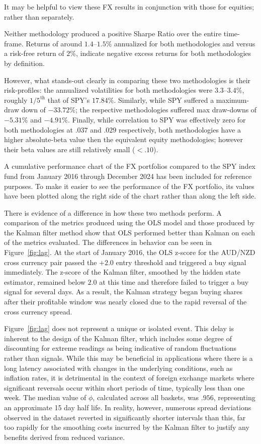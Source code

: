 \documentclass[12pt]{article}
\begin{document}
It may be helpful to view these FX results in conjunction with those for equities; rather than separately.

Neither methodology produced a positive Sharpe Ratio over the entire time-frame. Returns of around $1.4$--$1.5\%$ annualized for both methodologies and versus a risk-free return of $2\%$, indicate negative excess returns for both methodologies by definition.

However, what stands-out clearly in comparing these two methodologies is their risk-profiles: the annualized volatilities for both methodologies were $3.3$--$3.4\%$, roughly $1/5^{\text{th}}$ that of SPY's $17.84\%$. Similarly, while SPY suffered a maximum-draw down of $-33.72\%$; the respective methodologies suffered max draw-downs of $-5.31\%$ and $-4.91\%$. Finally, while correlation to SPY was effectively zero for both methodologies at $.037$ and $.029$ respectively, both methodologies have a higher absolute-beta value then the equivalent equity methodologies; however their beta values are still relatively small ($<.10$).

A cumulative performance chart of the FX portfolios compared to the SPY index fund from January 2016 through December 2024 has been included for reference purposes. To make it easier to see the performance of the FX portfolio, its values have been plotted along the right side of the chart rather than along the left side.

There is evidence of a difference in how these two methods perform. A comparison of the metrics produced using the OLS model and those produced by the Kalman filter method show that OLS performed better than Kalman on each of the metrics evaluated. The differences in behavior can be seen in Figure~\ref{fig:lag}. At the start of January 2016, the OLS z-score for the AUD/NZD cross currency pair passed the $+2.0$ entry threshold and triggered a buy signal immediately. The z-score of the Kalman filter, smoothed by the hidden state estimator, remained below $2.0$ at this time and therefore failed to trigger a buy signal for several days. As a result, the Kalman strategy began buying shares after their profitable window was nearly closed due to the rapid reversal of the cross currency spread.

Figure~\ref{fig:lag} does not represent a unique or isolated event. This delay is inherent to the design of the Kalman filter, which includes some degree of discounting for extreme readings as being indicative of random fluctuations rather than signals. While this may be beneficial in applications where there is a long latency associated with changes in the underlying conditions, such as inflation rates, it is detrimental in the context of foreign exchange markets where significant reversals occur within short periods of time, typically less than one week. The median value of $\phi$, calculated across all baskets, was $.956$, representing an approximate 15 day half life. In reality, however, numerous spread deviations observed in the dataset reverted in significantly shorter intervals than this, far too rapidly for the smoothing costs incurred by the Kalman filter to justify any benefits derived from reduced variance.
\end{document}

